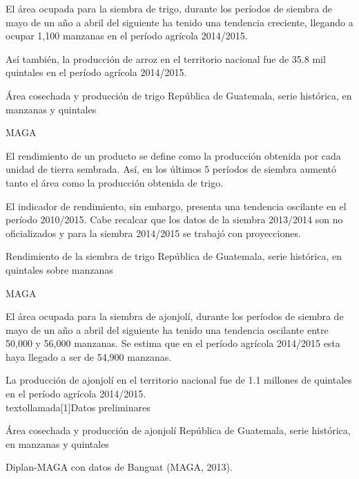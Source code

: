 
%
{%
El área ocupada para la siembra de trigo, durante los períodos de siembra de mayo de un año a abril del siguiente ha tenido una tendencia creciente, llegando a ocupar 1,100  manzanas en el período agrícola 2014/2015.

Así también, la producción de arroz en el territorio nacional fue de 35.8 mil quintales en el período agrícola 2014/2015.
}%
{%
	Área cosechada y producción de trigo} %
{%
	República de Guatemala, serie histórica, en manzanas y  quintales } %
{%
	\begin{tikzpicture}[x=1pt,y=1pt]    \end{tikzpicture}}%
{%
	MAGA} %



%
{%
El rendimiento de un producto se define como la producción obtenida por cada unidad de tierra sembrada. Así, en los últimos 5 períodos de siembra aumentó tanto el área como la producción obtenida de trigo.

El indicador de rendimiento, sin embargo, presenta una tendencia oscilante en el período 2010/2015. Cabe recalcar que los datos de la siembra 2013/2014 son no oficializados y para la siembra 2014/2015 se trabajó con proyecciones. 
}%
{%
	Rendimiento de la siembra de trigo} %
{%
	República de Guatemala, serie histórica, en quintales sobre manzanas } %
{%
	\begin{tikzpicture}[x=1pt,y=1pt]    \end{tikzpicture}}%
{%
	MAGA } %


%
{%
El área ocupada para la siembra de ajonjolí, durante los períodos de siembra de mayo de un año a abril del siguiente ha tenido una tendencia oscilante entre 50,000 y 56,000 manzanas.  Se estima que en el período agrícola 2014/2015 esta haya llegado a ser de 54,900 manzanas.

La producción de ajonjolí en el territorio nacional fue de 1.1 millones de quintales en el período agrícola 2014/2015.\\textollamada[1]{Datos preliminares}
}%
{%
	Área cosechada y producción de ajonjolí} %
{%
	República de Guatemala, serie histórica, en manzanas y  quintales } %
{%
	\begin{tikzpicture}[x=1pt,y=1pt]    \end{tikzpicture}}%
{%
	Diplan-MAGA con datos de Banguat (MAGA, 2013).} %


